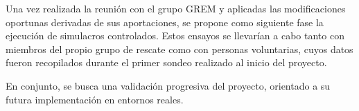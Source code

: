    Una vez realizada la reunión con el grupo GREM y aplicadas las modificaciones oportunas derivadas de sus aportaciones, se propone como siguiente fase la ejecución de simulacros controlados. Estos ensayos se llevarían a cabo tanto con miembros del propio grupo de rescate como con personas voluntarias, cuyos datos fueron recopilados durante el primer sondeo realizado al inicio del proyecto.

   En conjunto, se busca una validación progresiva del proyecto, orientado a su futura implementación en entornos reales.
    

    

